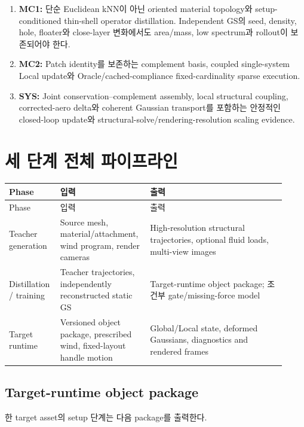 \documentclass[11pt,a4paper]{article}
\begin{document}
\begin{enumerate}[leftmargin=1.7em]
  \item \textbf{MC1:} 단순 Euclidean kNN이 아닌 oriented material topology와
  setup-conditioned thin-shell operator distillation. Independent GS의 seed, density, hole,
  floater와 close-layer 변화에서도 area/mass, low spectrum과 rollout이 보존되어야 한다.
  \item \textbf{MC2:} Patch identity를 보존하는 complement basis, coupled single-system Local update와
  Oracle/cached-compliance fixed-cardinality sparse execution.
  \item \textbf{SYS:} Joint conservation--complement assembly, local structural coupling,
  corrected-aero delta와 coherent Gaussian transport를 포함하는 안정적인 closed-loop update와
  structural-solve/rendering-resolution scaling evidence.
\end{enumerate}

\section{세 단계 전체 파이프라인}

\begin{longtable}{L{0.17\linewidth}L{0.28\linewidth}L{0.47\linewidth}}
\toprule
Phase & 입력 & 출력 \\
\midrule
\endfirsthead
\toprule
Phase & 입력 & 출력 \\
\midrule
\endhead
Teacher generation & Source mesh, material/attachment, wind program, render cameras & High-resolution structural trajectories, optional fluid loads, multi-view images \\
\addlinespace
Distillation / training & Teacher trajectories, independently reconstructed static GS & Target-runtime object package; 조건부 gate/missing-force model \\
\addlinespace
Target runtime & Versioned object package, prescribed wind, fixed-layout handle motion & Global/Local state, deformed Gaussians, diagnostics and rendered frames \\
\bottomrule
\end{longtable}

\subsection{Target-runtime object package}

한 target asset의 setup 단계는 다음 package를 출력한다.
\end{document}

